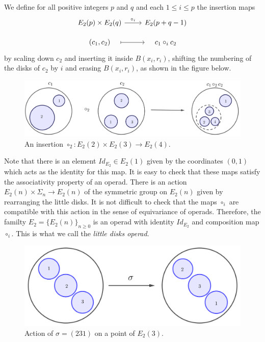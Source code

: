 \documentclass[TFM.tex]{subfiles}
\begin{document}
 
 
 We define for all positive integers $p$ and $q$ and  each $1\leq i\leq p$ the insertion maps 
 \[
 \begin{tikzcd}[row sep=10]
  E_2(p)\times E_2(q)\arrow[r, "\circ_i"] & E_2(p+q-1)\\
  (c_1,c_2)\arrow[r, mapsto, shorten <= 1em, shorten >= 1em] & c_1\circ_i c_2
 \end{tikzcd}
 \]
 by scaling down $c_2$ and inserting it inside $B(x_i,r_i)$, shifting the numbering of the disks of $c_2$ by $i$ and erasing $B(x_i,r_i)$, as shown in the figure below. 
 \begin{figure}[h!]
  \centering
\includegraphics[scale=0.3]{Imagenes/insertion}
\caption{An insertion $\circ_2:E_2(2)\times E_2(3)\to E_2(4)$.}
 \end{figure}

Note that there is an element $Id_{E_2}\in E_2(1)$ given by the coordinates $(0,1)$ which acts as the identity for this map. It is easy to check that these maps satisfy the associativity property of an operad. There is an action $E_2(n)\times \Sigma_n\to E_2(n)$ of the symmetric group on $E_2(n)$ given by rearranging the little disks. It is not difficult to check that the maps $\circ_i$ are compatible with this action in the sense of equivariance of operads. Therefore, the familty $E_2=\{E_2(n)\}_{n\geq 0}$ is an operad with identity $Id_{E_2}$ and composition map $\circ_i$. This is what we call the \emph{little disks operad}.




\begin{figure}[h!]
\includegraphics[scale=0.35]{Imagenes//accion}
\caption{Action of $\sigma=(231)$ on a point of $E_2(3)$.}
\end{figure}
\end{document}
